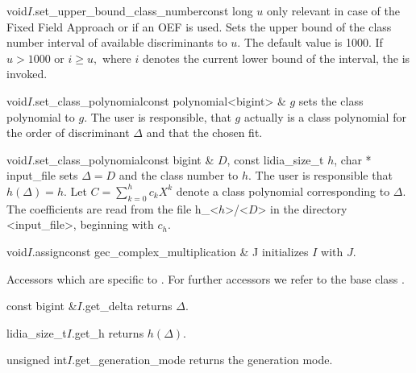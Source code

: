 \begin{fcode}{void}{$I$.set_upper_bound_class_number}{const long $u$}
  only relevant in case of the Fixed Field Approach or if an OEF is used.
  Sets the upper bound of the class number interval of available
  discriminants to $u.$ The default value is 1000. If $u>1000$
  or $i\geq u,$ where $i$ denotes the current lower bound of the interval,
  the  is invoked.
\end{fcode}

\begin{fcode}{void}{$I$.set_class_polynomial}{const polynomial<bigint> & $g$}
  sets the class polynomial to $g.$ The user is responsible, that
  $g$ actually is a class polynomial for the order of discriminant $\Delta$
  and that the chosen  fit.
\end{fcode}

\begin{fcode}{void}{$I$.set_class_polynomial}{const bigint & $D$,
const lidia_size_t $h$, char * input_file}
  sets $\Delta=D$ and the class number to $h.$ The user is responsible
  that $h(\Delta) = h.$ Let $C=\sum_{k=0}^h c_kX^k$ denote
  a class polynomial corresponding to $\Delta.$ The coefficients
  are read from the file h\_<$h$>/<$D$> in the directory <input\_file>,
  beginning with $c_h.$
\end{fcode}

\begin{fcode}{void}{$I$.assign}{const gec_complex_multiplication & J}
  initializes $I$ with $J.$
\end{fcode}



\ACCS

Accessors which are specific to . 
For further accessors we refer to the base class .

\begin{cfcode}{const bigint &}{$I$.get_delta}{}
  returns $\Delta.$
\end{cfcode}

\begin{cfcode}{lidia_size_t}{$I$.get_h}{}
  returns $h(\Delta).$
\end{cfcode}

\begin{cfcode}{unsigned int}{$I$.get_generation_mode}{}
  returns the generation mode.
\end{cfcode}

